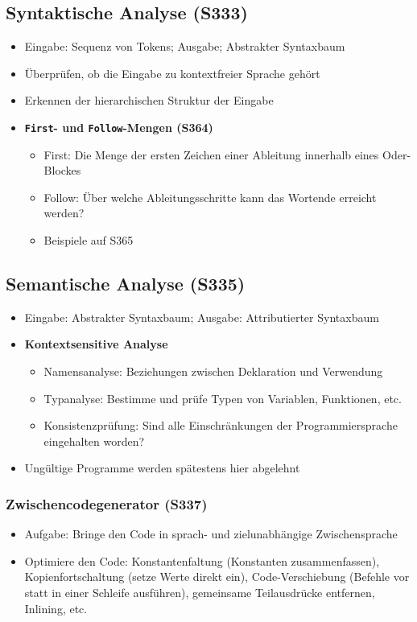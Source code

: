 \subsection{Syntaktische Analyse (S333)}
\begin{itemize}
	\item Eingabe: Sequenz von Tokens; Ausgabe; Abstrakter Syntaxbaum
	\item Überprüfen, ob die Eingabe zu kontextfreier Sprache gehört
	\item Erkennen der hierarchischen Struktur der Eingabe
	\item \textbf{\texttt{First}- und \texttt{Follow}-Mengen (S364)}
	\begin{itemize}
		\item First: Die Menge der ersten Zeichen einer Ableitung innerhalb eines Oder-Blockes
		\item Follow: Über welche Ableitungsschritte kann das Wortende erreicht werden? 
		\item Beispiele auf S365
	\end{itemize}
\end{itemize}

\subsection{Semantische Analyse (S335)}
\begin{itemize}
	\item Eingabe: Abstrakter Syntaxbaum; Ausgabe: Attributierter Syntaxbaum
	\item \textbf{Kontextsensitive Analyse}
	\begin{itemize}
		\item Namensanalyse: Beziehungen zwischen Deklaration und Verwendung
		\item Typanalyse: Bestimme und prüfe Typen von Variablen, Funktionen, etc.
		\item Konsistenzprüfung: Sind alle Einschränkungen der Programmiersprache eingehalten worden?
	\end{itemize}
	\item Ungültige Programme werden spätestens hier abgelehnt
\end{itemize}

\subsubsection{Zwischencodegenerator (S337)}
\begin{itemize}
	\item Aufgabe: Bringe den Code in sprach- und zielunabhängige Zwischensprache
	\item Optimiere den Code: Konstantenfaltung (Konstanten zusammenfassen), Kopienfortschaltung (setze Werte direkt ein), Code-Verschiebung (Befehle vor statt in einer Schleife ausführen), gemeinsame Teilausdrücke entfernen, Inlining, etc.
\end{itemize}

